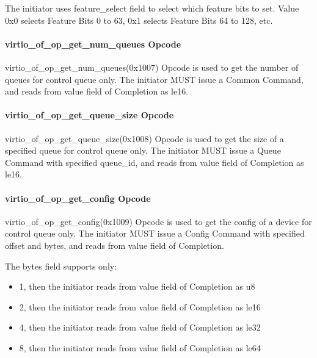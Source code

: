 The initiator uses feature_select field to select which feature bits to set. Value 0x0 selects Feature Bits 0 to 63, 0x1 selects Feature Bits 64 to 128, etc.

\paragraph{virtio_of_op_get_num_queues Opcode}\label{sec:Virtio Transport Options / Virtio Over Fabrics / Transmition Protocol / Opcodes Definition / virtio_of_op_get_num_queues Opcode}

virtio_of_op_get_num_queues(0x1007) Opcode is used to get the number of queues for control queue only. The initiator MUST issue a Common Command, and reads from value field of Completion as le16.

\paragraph{virtio_of_op_get_queue_size Opcode}\label{sec:Virtio Transport Options / Virtio Over Fabrics / Transmition Protocol / Opcodes Definition / virtio_of_op_get_queue_size Opcode}

virtio_of_op_get_queue_size(0x1008) Opcode is used to get the size of a specified queue for control queue only. The initiator MUST issue a Queue Command with specified queue_id, and reads from value field of Completion as le16.

\paragraph{virtio_of_op_get_config Opcode}\label{sec:Virtio Transport Options / Virtio Over Fabrics / Transmition Protocol / Opcodes Definition / virtio_of_op_get_config Opcode}

virtio_of_op_get_config(0x1009) Opcode is used to get the config of a device for control queue only. The initiator MUST issue a Config Command with specified offset and bytes, and reads from value field of Completion.

The bytes field supports only:

\begin{itemize}
\item 1, then the initiator reads from value field of Completion as u8
\item 2, then the initiator reads from value field of Completion as le16
\item 4, then the initiator reads from value field of Completion as le32
\item 8, then the initiator reads from value field of Completion as le64
\end{itemize}

